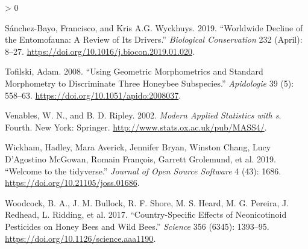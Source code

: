 \documentclass[
]{article}
\newlength{\cslhangindent}
\newenvironment{CSLReferences}[2] %
 {%
  \setlength{\parindent}{0pt}
  \ifodd #1 \everypar{\setlength{\hangindent}{\cslhangindent}}\ignorespaces\fi
  \ifnum #2 > 0
  \setlength{\parskip}{#2\baselineskip}
  \fi
 }%
 {}
\begin{document}
\begin{CSLReferences}{1}{0}
\leavevmode\hypertarget{ref-suxe1nchez-bayo2019}{}%
Sánchez-Bayo, Francisco, and Kris A.G. Wyckhuys. 2019. {``Worldwide Decline of the Entomofauna: A Review of Its Drivers.''} \emph{Biological Conservation} 232 (April): 8--27. \url{https://doi.org/10.1016/j.biocon.2019.01.020}.

\leavevmode\hypertarget{ref-tofilski2008}{}%
Tofilski, Adam. 2008. {``Using Geometric Morphometrics and Standard Morphometry to Discriminate Three Honeybee Subspecies.''} \emph{Apidologie} 39 (5): 558--63. \url{https://doi.org/10.1051/apido:2008037}.

\leavevmode\hypertarget{ref-MASS2002}{}%
Venables, W. N., and B. D. Ripley. 2002. \emph{Modern Applied Statistics with s}. Fourth. New York: Springer. \url{http://www.stats.ox.ac.uk/pub/MASS4/}.

\leavevmode\hypertarget{ref-tidyverse2019}{}%
Wickham, Hadley, Mara Averick, Jennifer Bryan, Winston Chang, Lucy D'Agostino McGowan, Romain François, Garrett Grolemund, et al. 2019. {``Welcome to the {tidyverse}.''} \emph{Journal of Open Source Software} 4 (43): 1686. \url{https://doi.org/10.21105/joss.01686}.

\leavevmode\hypertarget{ref-woodcock2017}{}%
Woodcock, B. A., J. M. Bullock, R. F. Shore, M. S. Heard, M. G. Pereira, J. Redhead, L. Ridding, et al. 2017. {``Country-Specific Effects of Neonicotinoid Pesticides on Honey Bees and Wild Bees.''} \emph{Science} 356 (6345): 1393--95. \url{https://doi.org/10.1126/science.aaa1190}.

\end{CSLReferences}
\end{document}
